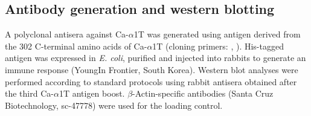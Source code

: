 \subsection*{Antibody generation and western blotting}

A polyclonal antisera against Ca-$\alpha$1T was generated using antigen derived from the 302 C-terminal amino acids of Ca-$\alpha$1T (cloning primers: , ).
His-tagged antigen was expressed in \emph{E. coli}, purified and injected into rabbits to generate an immune response (YoungIn Frontier, South Korea).
Western blot analyses were performed according to standard protocols using rabbit antisera obtained after the third Ca-$\alpha$1T antigen boost.
$\beta$-Actin-specific antibodies (Santa Cruz Biotechnology, sc-47778) were used for the loading control.
